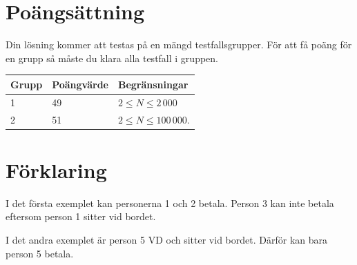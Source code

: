 \section*{Poängsättning}
Din lösning kommer att testas på en mängd testfallsgrupper. För att få poäng för en grupp så måste du klara alla testfall i gruppen.

\begin{tabular}{| l | l | l |}
	\hline
	Grupp & Poängvärde & Begränsningar\\ \hline
  1     & 49         & $2 \le N \le 2\,000$ \\ \hline
  2     & 51         & $2 \le N \le 100\,000$. \\ \hline
\end{tabular}

\section*{Förklaring}
I det första exemplet kan personerna 1 och 2 betala. Person 3 kan inte betala eftersom person 1 sitter vid bordet.

I det andra exemplet är person 5 VD och sitter vid bordet. Därför kan bara person 5 betala.
